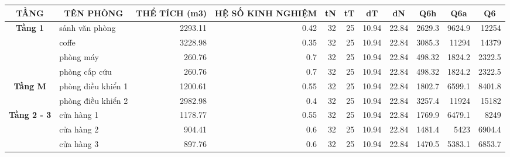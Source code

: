 \begin{landscape}
	\begin{table}[H]
		\vspace{0.5cm}
		\centering
	\begin{adjustbox}{width=1.5\textheight}
		\begin{tabular}{|c|l|r|r|r|r|r|r|r|r|r|}
			\hline
			\textbf{TẦNG} & \multicolumn{1}{c|}{\textbf{TÊN PHÒNG}} & \multicolumn{1}{p{6.645em}|}{\textbf{THỂ TÍCH (m3) }} & \multicolumn{1}{p{6.855em}|}{\textbf{HỆ SỐ KINH NGHIỆM}} & \multicolumn{1}{c|}{\textbf{tN}} & \multicolumn{1}{c|}{\textbf{tT}} & \multicolumn{1}{c|}{\textbf{dT}} & \multicolumn{1}{c|}{\textbf{dN}} & \multicolumn{1}{c|}{\textbf{Q6h}} & \multicolumn{1}{c|}{\textbf{Q6a}} & \multicolumn{1}{c|}{\textbf{Q6}} \bigstrut\\
			\hline
			\multirow{4}[8]{*}{\textbf{Tầng 1}} & sảnh văn phòng & 2293.11  & 0.42     & 32       & 25       & 10.94    & 22.84    & 2629.3   & 9624.9   & 12254 \bigstrut\\
			\cline{2-11}             & coffe    & 3228.98  & 0.35     & 32       & 25       & 10.94    & 22.84    & 3085.3   & 11294    & 14379 \bigstrut\\
			\cline{2-11}             & phòng máy & 260.76   & 0.7      & 32       & 25       & 10.94    & 22.84    & 498.32   & 1824.2   & 2322.5 \bigstrut\\
			\cline{2-11}             & phòng cấp cứu & 260.76   & 0.7      & 32       & 25       & 10.94    & 22.84    & 498.32   & 1824.2   & 2322.5 \bigstrut\\
			\hline
			\multirow{2}[4]{*}{\textbf{Tầng M}} & phòng điều khiển 1 & 1200.61  & 0.55     & 32       & 25       & 10.94    & 22.84    & 1802.7   & 6599.1   & 8401.8 \bigstrut\\
			\cline{2-11}             & phòng điều khiển 2 & 2982.98  & 0.4      & 32       & 25       & 10.94    & 22.84    & 3257.4   & 11924    & 15182 \bigstrut\\
			\hline
			\multirow{6}[12]{*}{\textbf{Tầng 2 - 3}} & cửa hàng 1 & 1178.77  & 0.55     & 32       & 25       & 10.94    & 22.84    & 1769.9   & 6479.1   & 8249 \bigstrut\\
			\cline{2-11}             & cửa hàng 2 & 904.41   & 0.6      & 32       & 25       & 10.94    & 22.84    & 1481.4   & 5423     & 6904.4 \bigstrut\\
			\cline{2-11}             & cửa hàng 3 & 897.76   & 0.6      & 32       & 25       & 10.94    & 22.84    & 1470.5   & 5383.1   & 6853.7 \bigstrut\\

\end{tabular}
\end{adjustbox}
\end{table}
\end{landscape}
